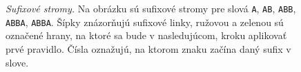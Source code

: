 \begin{figure}
\centering
{}
\qquad
{}
\qquad
{}

\qquad
{}
\caption{\emph{Sufixové stromy.} Na obrázku sú sufixové stromy pre slová 
{\tt A}, {\tt AB}, {\tt ABB}, {\tt ABBA}, {\tt ABBA\uz}. Šípky znázorňujú 
sufixové linky, ružovou a zelenou sú označené hrany, na ktoré sa bude v 
nasledujúcom, kroku aplikovať prvé pravidlo. Čísla oznažujú, na ktorom znaku 
začína daný sufix v slove.}
\label{img:sxsx}
\end{figure}

